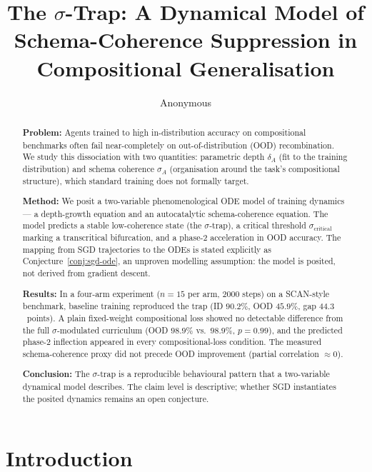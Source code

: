 \documentclass{article}
\title{The $\sigma$-Trap: A Dynamical Model of Schema-Coherence Suppression in Compositional Generalisation}
\author{Anonymous}
\date{}
\theoremstyle{definition}
\begin{document}
\maketitle

\begin{abstract}
\textbf{Problem:} Agents trained to high in-distribution accuracy on
compositional benchmarks often fail near-completely on
out-of-distribution (OOD) recombination. We study this dissociation
with two quantities: parametric depth $\delta_A$ (fit to the training
distribution) and schema coherence $\sigma_A$ (organisation around the
task's compositional structure), which standard training does not
formally target.

\textbf{Method:} We posit a two-variable phenomenological ODE model of
training dynamics --- a depth-growth equation and an autocatalytic
schema-coherence equation. The model predicts a stable low-coherence
state (the $\sigma$-trap), a critical threshold
$\sigma_{\text{critical}}$ marking a transcritical bifurcation, and a
phase-2 acceleration in OOD accuracy. The mapping from SGD trajectories
to the ODEs is stated explicitly as Conjecture~\ref{conj:sgd-ode}, an
unproven modelling assumption: the model is posited, not derived from
gradient descent.

\textbf{Results:} In a four-arm experiment ($n = 15$ per arm, 2000
steps) on a SCAN-style benchmark, baseline training reproduced the trap
(ID $90.2\%$, OOD $45.9\%$, gap $44.3$~points). A plain fixed-weight
compositional loss showed no detectable difference from the full
$\sigma$-modulated curriculum (OOD $98.9\%$ vs.\ $98.9\%$,
$p = 0.99$), and the predicted phase-2
inflection appeared in every compositional-loss condition. The measured
schema-coherence proxy did not precede OOD improvement (partial
correlation $\approx 0$).

\textbf{Conclusion:} The $\sigma$-trap is a reproducible behavioural
pattern that a two-variable dynamical model describes. The claim level
is descriptive; whether SGD instantiates the posited dynamics remains an
open conjecture.
\end{abstract}


\section{Introduction}\label{sec:introduction}
\end{document}
